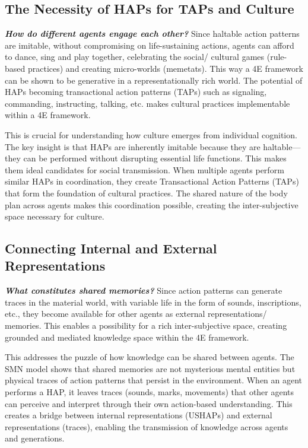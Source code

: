 \subsection{The Necessity of HAPs for TAPs and Culture}
\textbf{\textit{How do different agents engage each other?}} Since haltable action patterns are imitable, without compromising on life-sustaining actions, agents can afford to dance, sing and play together, celebrating the social/ cultural games (rule-based practices) and creating micro-worlds (memetats). This way a 4E framework can be shown to be generative in a representationally rich world. The potential of HAPs becoming transactional action patterns (TAPs) such as signaling, commanding, instructing, talking, etc. makes cultural practices implementable within a 4E framework.

This is crucial for understanding how culture emerges from individual cognition. The key insight is that HAPs are inherently imitable because they are haltable—they can be performed without disrupting essential life functions. This makes them ideal candidates for social transmission. When multiple agents perform similar HAPs in coordination, they create Transactional Action Patterns (TAPs) that form the foundation of cultural practices. The shared nature of the body plan across agents makes this coordination possible, creating the inter-subjective space necessary for culture.

\subsection{Connecting Internal and External Representations}
\textbf{\textit{What constitutes shared memories?}} Since action patterns can generate traces in the material world, with variable life in the form of sounds, inscriptions, etc., they become available for other agents as external representations/ memories. This enables a possibility for a rich inter-subjective space, creating grounded and mediated knowledge space within the 4E framework.

This addresses the puzzle of how knowledge can be shared between agents. The SMN model shows that shared memories are not mysterious mental entities but physical traces of action patterns that persist in the environment. When an agent performs a HAP, it leaves traces (sounds, marks, movements) that other agents can perceive and interpret through their own action-based understanding. This creates a bridge between internal representations (USHAPs) and external representations (traces), enabling the transmission of knowledge across agents and generations.

